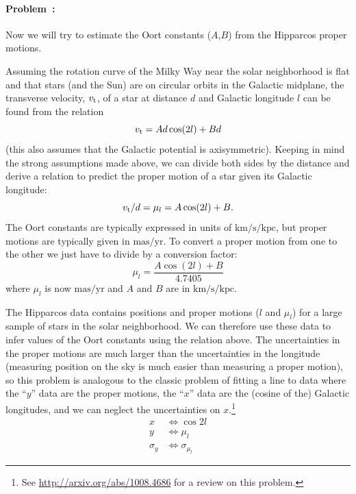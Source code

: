 \documentclass[12pt,twoside]{article}
\newcommand{\problemname}{Problem}
\newcounter{problem}
\newenvironment{problem}{\paragraph{\problemname~\theproblem:}\refstepcounter{problem}}{}
\begin{document}
\begin{problem}
Now we will try to estimate the Oort constants ($A$,$B$) from the Hipparcos proper motions. 

Assuming the rotation curve of the Milky Way near the solar neighborhood is flat and that stars (and the Sun) are on circular orbits in the Galactic midplane, the transverse velocity, $v_{\rm t}$, of a star at distance $d$ and Galactic longitude $l$ can be found from the relation
\begin{equation}
	v_{\rm t} = Ad\cos(2l) + Bd
\end{equation}
(this also assumes that the Galactic potential is axisymmetric). Keeping in mind the strong assumptions made above, we can divide both sides by the distance and derive a relation to predict the proper motion of a star given its Galactic longitude:
\begin{equation}
	v_{\rm t}/d = \mu_l = A\cos(2l) + B.
\end{equation}
The Oort constants are typically expressed in units of $\mathrm{km}/\mathrm{s}/\mathrm{kpc}$, but proper motions are typically given in $\mathrm{mas}/\mathrm{yr}$. To convert a proper motion from one to the other we just have to divide by a conversion factor:
\begin{equation}
	\mu_l = \frac{A\cos(2l) + B}{4.7405}
\end{equation}
where $\mu_l$ is now $\mathrm{mas}/\mathrm{yr}$ and $A$ and $B$ are in $\mathrm{km}/\mathrm{s}/\mathrm{kpc}$. 

The Hipparcos data contains positions and proper motions ($l$ and $\mu_l$) for a large sample of stars in the solar neighborhood. We can therefore use these data to infer values of the Oort constants using the relation above. The uncertainties in the proper motions are much larger than the uncertainties in the longitude (measuring position on the sky is much easier than measuring a proper motion), so this problem is analogous to the classic problem of fitting a line to data where the ``$y$'' data are the proper motions, the ``$x$'' data are the (cosine of the) Galactic longitudes, and we can neglect the uncertainties on $x$.\footnote{See \url{http://arxiv.org/abs/1008.4686} for a review on this problem.}
\begin{align}
	x &\iff \cos{2l} \\
	y &\iff \mu_l \\
	\sigma_y &\iff \sigma_{\mu_l}
\end{align}


\end{problem}
\end{document}
